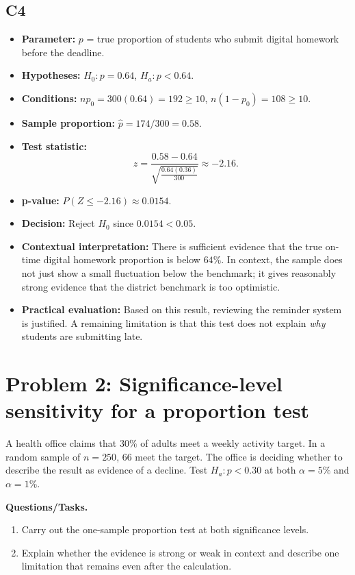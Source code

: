	\subsection*{C4}
	\begin{itemize}
		\item \textbf{Parameter:} \(p\) = true proportion of students who submit digital homework before the deadline.
		\item \textbf{Hypotheses:} \(H_0:p=0.64\), \(H_a:p<0.64\).
		\item \textbf{Conditions:} \(np_0=300(0.64)=192\ge10\), \(n(1-p_0)=108\ge10\).
		\item \textbf{Sample proportion:} \(\hat p=174/300=0.58\).
		\item \textbf{Test statistic:}
		\[
		z=\frac{0.58-0.64}{\sqrt{\frac{0.64(0.36)}{300}}}\approx -2.16.
		\]
		\item \textbf{p-value:} \(P(Z\le -2.16)\approx 0.0154\).
		\item \textbf{Decision:} Reject \(H_0\) since \(0.0154<0.05\).
		\item \textbf{Contextual interpretation:} There is sufficient evidence that the true on-time digital homework proportion is below \(64\%\). In context, the sample does not just show a small fluctuation below the benchmark; it gives reasonably strong evidence that the district benchmark is too optimistic.
		\item \textbf{Practical evaluation:} Based on this result, reviewing the reminder system is justified. A remaining limitation is that this test does not explain \emph{why} students are submitting late.
	\end{itemize}
	
	\begin{center}
	\end{center}
	
	\section{Problem 2: Significance-level sensitivity for a proportion test}
	A health office claims that \(30\%\) of adults meet a weekly activity target. In a random sample of \(n=250\), \(66\) meet the target. The office is deciding whether to describe the result as evidence of a decline. Test \(H_a:p<0.30\) at both \(\alpha=5\%\) and \(\alpha=1\%\).
	
	\textbf{Questions/Tasks.}
	\begin{enumerate}
		\item[(a)] Carry out the one-sample proportion test at both significance levels.
		\item[(b)] Explain whether the evidence is strong or weak in context and describe one limitation that remains even after the calculation.
	\end{enumerate}
	
